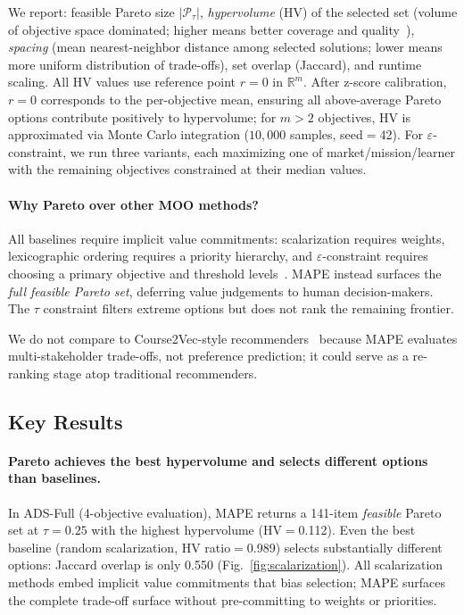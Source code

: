 \documentclass[sigconf,review]{acmart}
\newcommand{\MainParetoSize}{141}
\newcommand{\MainHypervolume}{0.112}
\newcommand{\BestBaselineJaccard}{0.550}
\newcommand{\BestBaselineHVRatio}{0.989}     %
\newcommand{\MAPE}{\textsc{MAPE}\xspace}
\begin{document}
We report: feasible Pareto size $|\mathcal{P}_\tau|$, \emph{hypervolume} (HV) of the selected set (volume of objective space dominated; higher means better coverage and quality~\cite{zitzler1999hv}), \emph{spacing} (mean nearest-neighbor distance among selected solutions; lower means more uniform distribution of trade-offs), set overlap (Jaccard), and runtime scaling. All HV values use reference point $r = 0$ in $\mathbb{R}^m$. After z-score calibration, $r = 0$ corresponds to the per-objective mean, ensuring all above-average Pareto options contribute positively to hypervolume; for $m > 2$ objectives, HV is approximated via Monte Carlo integration ($10{,}000$ samples, seed$=$42). For $\varepsilon$-constraint, we run three variants, each maximizing one of market/mission/learner with the remaining objectives constrained at their median values.

\paragraph{Why Pareto over other MOO methods?}
All baselines require implicit value commitments: scalarization requires weights, lexicographic ordering requires a priority hierarchy, and $\varepsilon$-constraint requires choosing a primary objective and threshold levels~\cite{roijers2013survey_mosdm}. \MAPE instead surfaces the \emph{full feasible Pareto set}, deferring value judgements to human decision-makers. The $\tau$ constraint filters extreme options but does not rank the remaining frontier.

We do not compare to Course2Vec-style recommenders~\cite{morsy2019course2vec} because \MAPE evaluates multi-stakeholder trade-offs, not preference prediction; it could serve as a re-ranking stage atop traditional recommenders.

\subsection{Key Results}

\paragraph{Pareto achieves the best hypervolume and selects different options than baselines.}
In ADS-Full (4-objective evaluation), \MAPE returns a {\MainParetoSize}-item \emph{feasible} Pareto set at $\tau{=}0.25$ with the highest hypervolume (HV$=${\MainHypervolume}). Even the best baseline (random scalarization, HV ratio$=${\BestBaselineHVRatio}) selects substantially different options: Jaccard overlap is only {\BestBaselineJaccard} (Fig.~\ref{fig:scalarization}). All scalarization methods embed implicit value commitments that bias selection; \MAPE surfaces the complete trade-off surface without pre-committing to weights or priorities.
\end{document}
